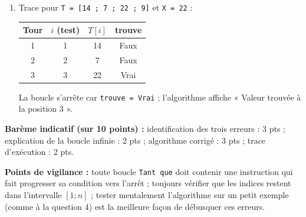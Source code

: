 \documentclass[11pt]{article}
\begin{document}
\begin{corrige}
\begin{enumerate}
\item Trace pour \texttt{T = [14 ; 7 ; 22 ; 9]} et \texttt{X = 22} :

\begin{center}
\begin{tabular}{|c|c|c|c|}
\hline
\rowcolor{popblueL} Tour & $i$ (test) & $T[i]$ & trouve \\
\hline
1 & 1 & 14 & Faux \\
\hline
2 & 2 & 7 & Faux \\
\hline
3 & 3 & 22 & Vrai \\
\hline
\end{tabular}
\end{center}

La boucle s'arrête car \texttt{trouve = Vrai} ; l'algorithme affiche « Valeur trouvée à la position 3 ».
\end{enumerate}

\textbf{Barème indicatif (sur 10 points) :} identification des trois erreurs : 3 pts ; explication de la boucle infinie : 2 pts ; algorithme corrigé : 3 pts ; trace d'exécution : 2 pts.

\textbf{Points de vigilance :} toute boucle \texttt{Tant que} doit contenir une instruction qui fait progresser sa condition vers l'arrêt ; toujours vérifier que les indices restent dans l'intervalle $[1 ; n]$ ; tester mentalement l'algorithme sur un petit exemple (comme à la question 4) est la meilleure façon de débusquer ces erreurs.
\end{corrige}
\end{document}
